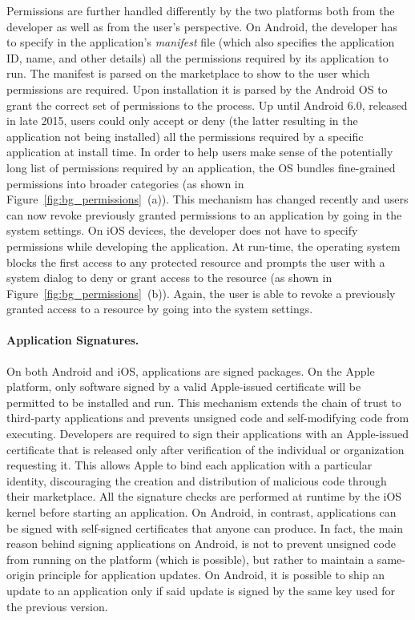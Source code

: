 Permissions are further handled differently by the two platforms both from the developer as well as from the user's perspective. On Android, the developer has to specify in the application's \emph{manifest} file (which also specifies the application ID, name, and other details) all the permissions required by its application to run. The manifest is parsed on the marketplace to show to the user which permissions are required. Upon installation it is parsed by the Android OS to grant the correct set of permissions to the process. Up until Android 6.0, released in late 2015, users could only accept or deny (the latter resulting in the application not being installed) all the permissions required by a specific application at install time. In order to help users make sense of the potentially long list of permissions required by an application, the OS bundles fine-grained permissions into broader categories (as shown in Figure~\ref{fig:bg_permissions}~(a)). This mechanism has changed recently and users can now revoke previously granted permissions to an application by going in the system settings. On iOS devices, the developer does not have to specify permissions while developing the application. At run-time, the operating system blocks the first access to any protected resource and prompts the user with a system dialog to deny or grant access to the resource (as shown in Figure~\ref{fig:bg_permissions}~(b)). Again, the user is able to revoke a previously granted access to a resource by going into the system settings.

\paragraph{Application Signatures.} On both Android and iOS, applications are signed packages. On the Apple platform, only software signed by a valid Apple-issued certificate will be permitted to be installed and run. This mechanism extends the chain of trust to third-party applications and prevents unsigned code and self-modifying code from executing. Developers are required to sign their applications with an Apple-issued certificate that is released only after verification of the individual or organization requesting it. This allows Apple to bind each application with a particular identity, discouraging the creation and distribution of malicious code through their marketplace. All the signature checks are performed at runtime by the iOS kernel before starting an application. On Android, in contrast, applications can be signed with self-signed certificates that anyone can produce. In fact, the main reason behind signing applications on Android, is not to prevent unsigned code from running on the platform (which is possible), but rather to maintain a same-origin principle for application updates. On Android, it is possible to ship an update to an application only if said update is signed by the same key used for the previous version.

